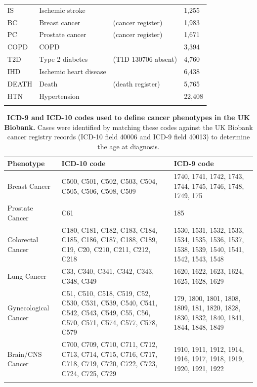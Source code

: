 \begin{table}[ht]
\begin{center}
\begin{tabularx}{\textwidth}{ll>{\raggedright\arraybackslash}Xl}
    IS & Ischemic stroke & 131368 & 1,255 \\
    BC & Breast cancer & 100092 (cancer register) & 1,983 \\
    PC & Prostate cancer & 100092 (cancer register) & 1,671 \\
    COPD & COPD & 131492 & 3,394 \\
    T2D & Type 2 diabetes & 130708 (T1D 130706 absent) & 4,760 \\
    IHD & Ischemic heart disease & 131306 & 6,438 \\
    DEATH & Death & 100093 (death register) & 5,765 \\
    HTN & Hypertension & 131286 & 22,408 \\
    \botrule
    \end{tabularx}
\end{center}
\end{table}

\clearpage

\begin{table}[H]
    \caption[ICD-9 and ICD-10 codes used to define cancer phenotypes in the UK Biobank]{\textbf{ICD-9 and ICD-10 codes used to define cancer phenotypes in the UK Biobank.} Cases were identified by matching these codes against the UK Biobank cancer registry records (ICD-10 field 40006 and ICD-9 field 40013) to determine the age at diagnosis.\label{tab:cancer_codes}}
    \begin{center}
    \begin{tabularx}{\textwidth}{lXX}
    \toprule
    \textbf{Phenotype} & \bf{ICD-10 code} & \textbf{ICD-9 code} \\
    \midrule
    Breast Cancer & 
    C500, C501, C502, C503, C504, C505, C506, C508, C509 & 
    1740, 1741, 1742, 1743, 1744, 1745, 1746, 1748, 1749, 175 \\
    \midrule
    Prostate Cancer & 
    C61 & 
    185 \\
    \midrule
    Colorectal Cancer & 
    C180, C181, C182, C183, C184, C185, C186, C187, C188, C189, C19, C20, C210, C211, C212, C218 & 
    1530, 1531, 1532, 1533, 1534, 1535, 1536, 1537, 1538, 1539, 1540, 1541, 1542, 1543, 1548 \\
    \midrule
    Lung Cancer & 
    C33, C340, C341, C342, C343, C348, C349 & 
    1620, 1622, 1623, 1624, 1625, 1628, 1629 \\
    \midrule
    Gynecological Cancer & 
    C51, C510, C518, C519, C52, C530, C531, C539, C540, C541, C542, C543, C549, C55, C56, C570, C571, C574, C577, C578, C579 & 
    179, 1800, 1801, 1808, 1809, 181, 1820, 1828, 1830, 1832, 1840, 1841, 1844, 1848, 1849 \\
    \midrule
    Brain/CNS Cancer & 
    C700, C709, C710, C711, C712, C713, C714, C715, C716, C717, C718, C719, C720, C722, C723, C724, C725, C729 & 
    1910, 1911, 1912, 1914, 1916, 1917, 1918, 1919, 1920, 1921, 1922 \\
    \botrule
    \end{tabularx}
    \end{center}
\end{table}

